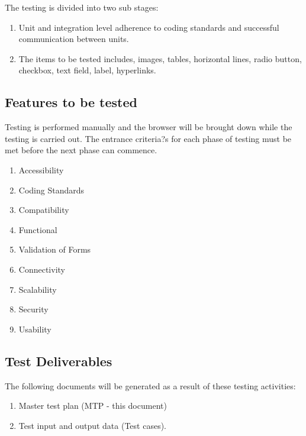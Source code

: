 \documentclass[12pt,a4paper]{article}
\begin{document}
The testing is divided into two sub stages:
\begin{enumerate}
\item Unit and integration level adherence to coding standards and successful communication between units.
\item The items to be tested includes, images, tables, horizontal lines, radio button, checkbox, text field, label, hyperlinks.
\end{enumerate}

\subsection{Features to be tested}
Testing is performed manually and the browser will be brought down while
the testing is carried out.
The entrance criteria?s for each phase of testing must be met before the next phase can commence.
\begin{enumerate}
\item Accessibility
\item Coding Standards
\item Compatibility
\item Functional
\item Validation of Forms
\item Connectivity
\item Scalability
\item Security
\item Usability
\end{enumerate}

\subsection{Test Deliverables}
The following documents will be generated as a result of these testing activities:
\begin{enumerate}
\item Master test plan (MTP - this document)
\item Test input and output data (Test cases).
\end{enumerate}
\end{document}
